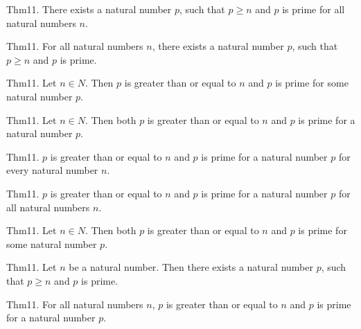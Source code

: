 \documentclass{article}
\begin{document}
Thm11. There exists a natural number $p$, such that $p \geq n$ and $p$ is prime for all natural numbers $n$.

Thm11. For all natural numbers $n$, there exists a natural number $p$, such that $p \geq n$ and $p$ is prime.

Thm11. Let $n \in N$. Then $p$ is greater than or equal to $n$ and $p$ is prime for some natural number $p$.

Thm11. Let $n \in N$. Then both $p$ is greater than or equal to $n$ and $p$ is prime for a natural number $p$.

Thm11. $p$ is greater than or equal to $n$ and $p$ is prime for a natural number $p$ for every natural number $n$.

Thm11. $p$ is greater than or equal to $n$ and $p$ is prime for a natural number $p$ for all natural numbers $n$.

Thm11. Let $n \in N$. Then both $p$ is greater than or equal to $n$ and $p$ is prime for some natural number $p$.

Thm11. Let $n$ be a natural number. Then there exists a natural number $p$, such that $p \geq n$ and $p$ is prime.

Thm11. For all natural numbers $n$, $p$ is greater than or equal to $n$ and $p$ is prime for a natural number $p$.
\end{document}
